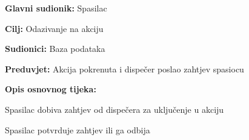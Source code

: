 					\noindent {}
					\begin{packed_item}
	
						\item \textbf{Glavni sudionik: }\text Spasilac
						\item  \textbf{Cilj:} \text Odazivanje na akciju
						\item  \textbf{Sudionici:} \text Baza podataka
						\item  \textbf{Preduvjet:} \text Akcija pokrenuta i dispečer poslao zahtjev spasiocu
						\item  \textbf{Opis osnovnog tijeka:}
						
						\item[] \begin{packed_enum}
	
							\item \text Spasilac dobiva zahtjev od dispečera za uključenje u akciju
							\item \text Spasilac potvrduje zahtjev ili ga odbija
						\end{packed_enum}
						
					\end{packed_item}
				
